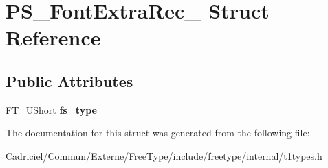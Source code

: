 \hypertarget{struct_p_s___font_extra_rec__}{}\section{P\+S\+\_\+\+Font\+Extra\+Rec\+\_\+ Struct Reference}
\label{struct_p_s___font_extra_rec__}
\subsection*{Public Attributes}
\begin{DoxyCompactItemize}
\item 
F\+T\+\_\+\+U\+Short {\bfseries fs\+\_\+type}\hypertarget{struct_p_s___font_extra_rec___a048e1e57ee974c3e05e9a88476e6b8a9}{}\label{struct_p_s___font_extra_rec___a048e1e57ee974c3e05e9a88476e6b8a9}

\end{DoxyCompactItemize}


The documentation for this struct was generated from the following file\+:\begin{DoxyCompactItemize}
\item 
Cadriciel/\+Commun/\+Externe/\+Free\+Type/include/freetype/internal/t1types.\+h\end{DoxyCompactItemize}

